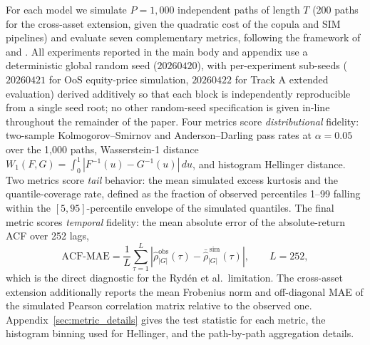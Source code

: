 For each model we simulate $P = 1{,}000$ independent paths of length $T$ (200 paths for the cross-asset extension, given the quadratic cost of the copula and SIM pipelines) and evaluate seven complementary metrics, following the framework of \cite{stenger2024thinking} and \cite{alswaidan2026hybrid}.
All experiments reported in the main body and appendix use a deterministic global random seed ($20260420$), with per-experiment sub-seeds ($20260421$ for OoS equity-price simulation, $20260422$ for Track A extended evaluation) derived additively so that each block is independently reproducible from a single seed root; no other random-seed specification is given in-line throughout the remainder of the paper.
Four metrics score \emph{distributional} fidelity: two-sample Kolmogorov--Smirnov \cite{kolmogorov1933, smirnov1948} and Anderson--Darling pass rates at $\alpha = 0.05$ over the 1{,}000 paths, Wasserstein-1 distance $W_1(F, G) = \int_0^1 |F^{-1}(u) - G^{-1}(u)|\, du$, and histogram Hellinger distance.
Two metrics score \emph{tail} behavior: the mean simulated excess kurtosis and the quantile-coverage rate, defined as the fraction of observed percentiles 1--99 falling within the $[5, 95]$-percentile envelope of the simulated quantiles.
The final metric scores \emph{temporal} fidelity: the mean absolute error of the absolute-return ACF over 252 lags,
\begin{equation}
    \text{ACF-MAE} = \frac{1}{L}\sum_{\tau=1}^{L} \left| \hat\rho^{\text{obs}}_{|G|}(\tau) - \bar{\hat\rho}^{\,\text{sim}}_{|G|}(\tau) \right|,
    \qquad L = 252,
    \label{eq:acf_mae}
\end{equation}
which is the direct diagnostic for the Ryd\'{e}n et al.\ limitation.
The cross-asset extension additionally reports the mean Frobenius norm and off-diagonal MAE of the simulated Pearson correlation matrix relative to the observed one.
Appendix~\ref{sec:metric_details} gives the test statistic for each metric, the histogram binning used for Hellinger, and the path-by-path aggregation details.

